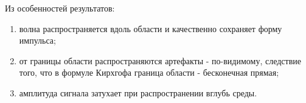 \documentclass{article}
\begin{document}
Из особенностей результатов:
\begin{enumerate}
\item волна распространяется вдоль области и качественно сохраняет форму импульса;
\item от границы области распространяются артефакты - по-видимому, следствие того, что
в формуле Кирхгофа граница области - бесконечная прямая;
\item амплитуда сигнала затухает при распространении вглубь среды.
\end{enumerate}
\end{document}
